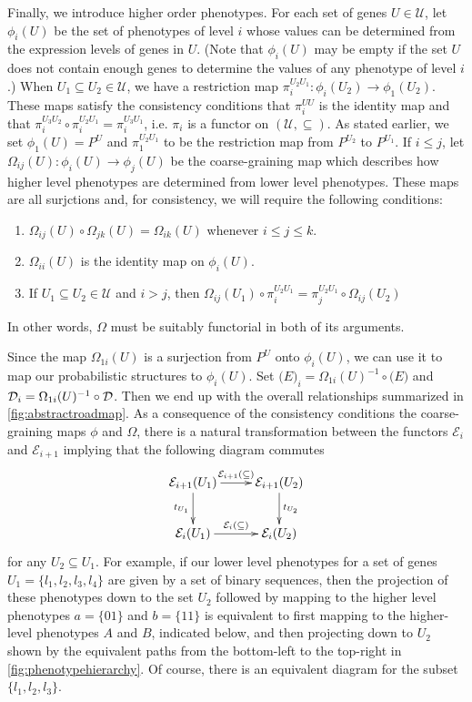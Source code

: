 Finally, we introduce higher order phenotypes.  For each set of genes $U \in \mathcal{U}$, let $\phi_i (U)$ be the set of phenotypes of level $i$ whose values can be determined from the expression levels of genes in $U$.  (Note that $\phi_i (U)$ may be empty if the set $U$ does not contain enough genes to determine the values of any phenotype of level $i$.)  When $U_1 \subseteq U_2 \in \mathcal{U}$, we have a restriction map $\pi_i^{U_2 U_1} \colon \phi_i(U_2) \to \phi_1(U_2)$.  These maps satisfy the consistency conditions that $\pi_i^{UU}$ is the identity map and that $\pi_i^{U_3 U_2} \circ \pi_i^{U_2 U_1} = \pi_i^{U_3 U_1}$, i.e. $\pi_i$ is a functor on $(\mathcal{U}, \subseteq)$.  As stated earlier, we set $\phi_1 (U) = P^U$ and $\pi_1^{U_2 U_1}$ to be the restriction map from $P^{U_2}$ to $P^{U_1}$.  If $i \le j$, let $\Omega_{ij}(U) : \phi_i(U) \to \phi_j(U)$ be the coarse-graining map which describes how higher level phenotypes are determined from lower level phenotypes.  These maps are all surjctions and, for consistency, we will require the following conditions:
\begin{enumerate}
\item $\Omega_{ij}(U) \circ \Omega_{jk}(U) = \Omega_{ik}(U)$ whenever $i \le j \le k$.
\item $\Omega_{ii}(U)$ is the identity map on $\phi_i (U)$.
\item If $U_1 \subseteq U_2 \in \mathcal{U}$ and $i > j$, then $\Omega_{ij}(U_1) \circ \pi_i^{U_2 U_1} = \pi_j^{U_2 U_1} \circ \Omega_{ij}(U_2)$
\end{enumerate}
In other words, $\Omega$ must be suitably functorial in both of its arguments.

Since the map $\Omega_{1i}(U)$ is a surjection from $P^U$ onto $\phi_i(U)$, we can use it to map our probabilistic structures to $\phi_i(U)$.  Set $\mathcal(E)_i = \Omega_{1i}(U)^{-1} \circ \mathcal(E)$ and $\mathcal{D}_i = \Omega_{1i}(U)^{-1} \circ \mathcal{D}$.  Then we end up with the overall relationships summarized in \ref{fig:abstractroadmap}. As a consequence of the consistency conditions the coarse-graining maps $\phi$ and $\Omega$, there is a natural transformation between the functors $\mathcal{E}_i$ and $\mathcal{E}_{i+1}$ implying that the following diagram commutes
$$
\xymatrix{
\mathcal{E}_{i+1}(U_1) \ar[r]^{\mathcal{E}_{i+1}(\subseteq)} \ar[d]_{t_{U_1}} & \mathcal{E}_{i+1}(U_2) \ar[d]^{t_{U_2}} \\
\mathcal{E}_{i}(U_1) \ar[r]^{\mathcal{E}_{i}(\subseteq)} & \mathcal{E}_{i}(U_2) }
$$
for any $U_2 \subseteq U_1$. For example, if our lower level phenotypes for a set of genes $U_1 = \{ l_1,l_2,l_3,l_4 \}$ are given by a set of binary sequences, then the projection of these phenotypes down to the set $U_2$ followed by mapping to the higher level phenotypes $a=\{01\}$ and $b=\{11\}$ is equivalent to first mapping to the higher-level phenotypes $A$ and $B$, indicated below, and then projecting down to $U_2$ shown by the equivalent paths from the bottom-left to the top-right in \ref{fig:phenotypehierarchy}.
Of course, there is an equivalent diagram for the subset $\{ l_1,l_2,l_3 \}$.

